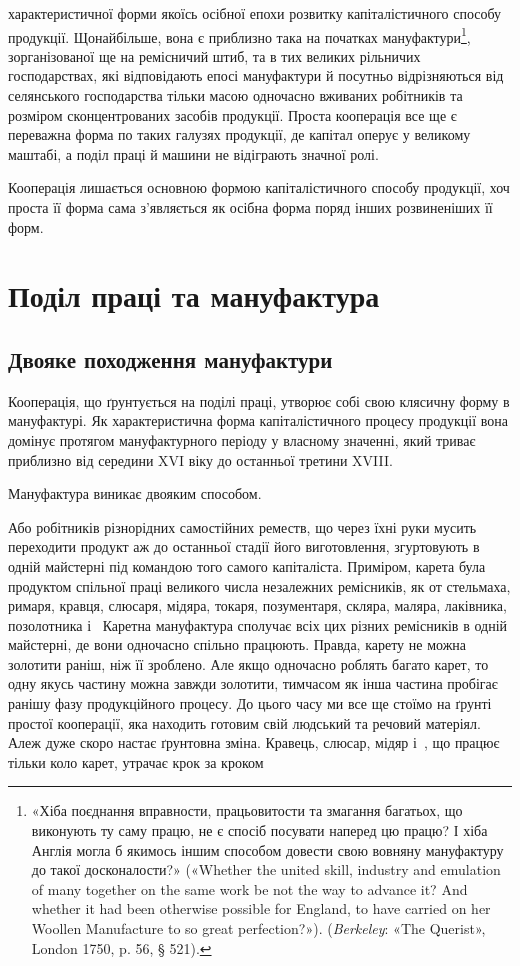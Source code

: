 \parcont{}  %
характеристичної форми якоїсь осібної епохи розвитку капіталістичного
способу продукції. Щонайбільше, вона є приблизно
така на початках мануфактури\footnote{
«Хіба поєднання вправности, працьовитости та змагання багатьох,
що виконують ту саму працю, не є спосіб посувати наперед цю працю?
І хіба Англія могла б якимось іншим способом довести свою вовняну мануфактуру
до такої досконалости?» («Whether the united skill, industry
and emulation of many together on the same work be not the way to advance
it? And whether it had been otherwise possible for England, to have
carried on her Woollen Manufacture to so great perfection?»). (\emph{Berkeley}: «The
Querist», London 1750, p. 56, § 521).
}, зорганізованої ще на ремісничий
штиб, та в тих великих рільничих господарствах, які відповідають
епосі мануфактури й посутньо відрізняються від селянського
господарства тільки масою одночасно вживаних робітників
та розміром сконцентрованих засобів продукції. Проста кооперація
все ще є переважна форма по таких галузях продукції, де
капітал оперує у великому маштабі, а поділ праці й машини не
відіграють значної ролі.

Кооперація лишається основною формою капіталістичного способу
продукції, хоч проста її форма сама з’являється як осібна
форма поряд інших розвиненіших її форм.

\section{Поділ праці та мануфактура}%
\subsection{Двояке походження мануфактури}

Кооперація, що ґрунтується на поділі праці, утворює собі
свою клясичну форму в мануфактурі. Як характеристична форма
капіталістичного процесу продукції вона домінує протягом мануфактурного
періоду у власному значенні, який триває приблизно
від середини XVI віку до останньої третини XVIII.

Мануфактура виникає двояким способом.

Або робітників різнорідних самостійних реместв, що через
їхні руки мусить переходити продукт аж до останньої стадії його
виготовлення, згуртовують в одній майстерні під командою того
самого капіталіста. Приміром, карета була продуктом спільної
праці великого числа незалежних ремісників, як от стельмаха,
римаря, кравця, слюсаря, мідяра, токаря, позументаря, скляра,
маляра, лаківника, позолотника і~ Каретна мануфактура
сполучає всіх цих різних ремісників в одній майстерні, де вони
одночасно спільно працюють. Правда, карету не можна золотити
раніш, ніж її зроблено. Але якщо одночасно роблять багато карет,
то одну якусь частину можна завжди золотити, тимчасом як
інша частина пробігає ранішу фазу продукційного процесу. До
цього часу ми все ще стоїмо на ґрунті простої кооперації, яка
находить готовим свій людський та речовий матеріял. Алеж
дуже скоро настає ґрунтовна зміна. Кравець, слюсар, мідяр і~, що працює тільки коло карет, утрачає крок за кроком
\parbreak{}  %
